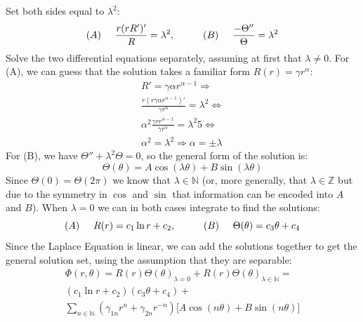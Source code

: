\documentclass[aps,twocolumn,pre,nofootinbib,10pt]{revtex4-1}
\begin{document}
Set both sides equal to $\lambda^2$:
\[ (A) \hspace{0.5cm} \frac{r(rR')'}{R} = \lambda^2, \hspace{1cm} (B) \hspace{0.5cm} \frac{- \Theta''}{\Theta} = \lambda^2 \]
Solve the two differential equations separately, assuming at first that $\lambda \neq 0$. For (A), we can guess that the solution takes a familiar form $R(r) = \gamma r^\alpha$:
\begin{gather*}
 R' = \gamma \alpha r^{\alpha - 1} \Rightarrow \\
 \frac{r(r\gamma \alpha r^{\alpha - 1})'}{\gamma r^\alpha} = \lambda^2 \Leftrightarrow \\
 \alpha^2 \frac{\gamma r r^{\alpha - 1}}{\gamma r^\alpha} = \lambda^2 5\Leftrightarrow \\
 \alpha^2 = \lambda^2 \Rightarrow \alpha = \pm \lambda 
\end{gather*}
For (B), we have $\Theta'' + \lambda^2 \Theta = 0$, so the general form of the solution is:
\[ \Theta(\theta) = A \cos(\lambda \theta) + B \sin(\lambda \theta) \]
Since $\Theta(0) = \Theta(2\pi)$ we know that $\lambda \in \mathbb{N}$ (or, more generally,
that $\lambda \in \mathbb{Z}$ but due to the symmetry in $\cos$ and $\sin$ that information can be encoded into $A$ and $B$).
When $\lambda = 0$ we can in both cases integrate to find the solutions:
\[ (A) \hspace{0.5cm} R(r) = c_1 \ln r + c_2,\hspace{1cm} (B)\hspace{0.5cm} \Theta(\theta) = c_3 \theta + c_4 \]
Since the Laplace Equation is linear, we can add the solutions together to get the general solution set, using the assumption that they are separable:
\begin{gather}
 \Phi(r, \theta) = R(r)\Theta(\theta)_{\lambda = 0} + R(r)\Theta(\theta)_{\lambda \in \mathbb{N}} = \nonumber \\
 (c_1 \ln r + c_2)(c_3 \theta + c_4) + \nonumber \\ 
\sum_{n \in \mathbb{N}} (\gamma_{1n} r^n + \gamma_{2n} r^{-n})
\big[A \cos(n \theta) + B \sin(n \theta) \big] \label{generalsol}
\end{gather}
\end{document}
